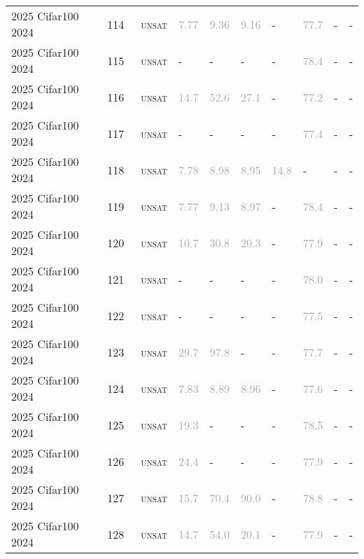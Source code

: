 \begin{center}
{\begin{longtable}{@{}llllllllll@{}}
2025 Cifar100 2024 & 114 & ~\textsc{unsat} & \textcolor{darkgray}{7.77} & \textcolor{darkgray}{9.36} & \textcolor{darkgray}{9.16} & - & \textcolor{darkgray}{77.7} & - & - \\
2025 Cifar100 2024 & 115 & ~\textsc{unsat} & - & - & - & - & \textcolor{darkgray}{78.4} & - & - \\
2025 Cifar100 2024 & 116 & ~\textsc{unsat} & \textcolor{darkgray}{14.7} & \textcolor{darkgray}{52.6} & \textcolor{darkgray}{27.1} & - & \textcolor{darkgray}{77.2} & - & - \\
2025 Cifar100 2024 & 117 & ~\textsc{unsat} & - & - & - & - & \textcolor{darkgray}{77.4} & - & - \\
2025 Cifar100 2024 & 118 & ~\textsc{unsat} & \textcolor{darkgray}{7.78} & \textcolor{darkgray}{8.98} & \textcolor{darkgray}{8.95} & \textcolor{darkgray}{14.8} & - & - & - \\
2025 Cifar100 2024 & 119 & ~\textsc{unsat} & \textcolor{darkgray}{7.77} & \textcolor{darkgray}{9.13} & \textcolor{darkgray}{8.97} & - & \textcolor{darkgray}{78.4} & - & - \\
2025 Cifar100 2024 & 120 & ~\textsc{unsat} & \textcolor{darkgray}{10.7} & \textcolor{darkgray}{30.8} & \textcolor{darkgray}{20.3} & - & \textcolor{darkgray}{77.9} & - & - \\
2025 Cifar100 2024 & 121 & ~\textsc{unsat} & - & - & - & - & \textcolor{darkgray}{78.0} & - & - \\
2025 Cifar100 2024 & 122 & ~\textsc{unsat} & - & - & - & - & \textcolor{darkgray}{77.5} & - & - \\
2025 Cifar100 2024 & 123 & ~\textsc{unsat} & \textcolor{darkgray}{29.7} & \textcolor{darkgray}{97.8} & - & - & \textcolor{darkgray}{77.7} & - & - \\
2025 Cifar100 2024 & 124 & ~\textsc{unsat} & \textcolor{darkgray}{7.83} & \textcolor{darkgray}{8.89} & \textcolor{darkgray}{8.96} & - & \textcolor{darkgray}{77.6} & - & - \\
2025 Cifar100 2024 & 125 & ~\textsc{unsat} & \textcolor{darkgray}{19.3} & - & - & - & \textcolor{darkgray}{78.5} & - & - \\
2025 Cifar100 2024 & 126 & ~\textsc{unsat} & \textcolor{darkgray}{24.4} & - & - & - & \textcolor{darkgray}{77.9} & - & - \\
2025 Cifar100 2024 & 127 & ~\textsc{unsat} & \textcolor{darkgray}{15.7} & \textcolor{darkgray}{70.4} & \textcolor{darkgray}{90.0} & - & \textcolor{darkgray}{78.8} & - & - \\
2025 Cifar100 2024 & 128 & ~\textsc{unsat} & \textcolor{darkgray}{14.7} & \textcolor{darkgray}{54.0} & \textcolor{darkgray}{20.1} & - & \textcolor{darkgray}{77.9} & - & - \\

\end{longtable}}
\end{center}
